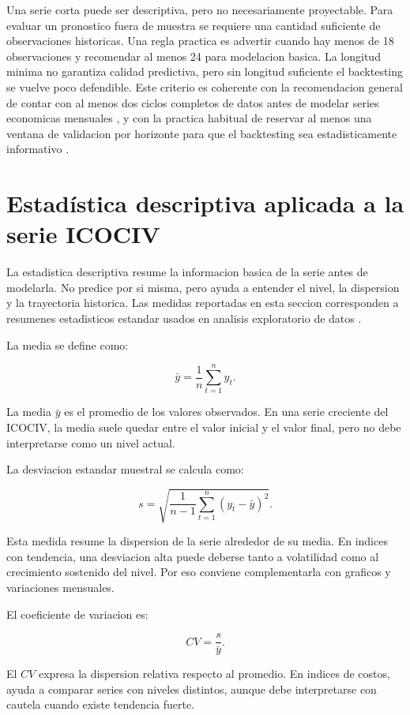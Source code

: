 ﻿\documentclass[12pt,letterpaper]{article}
\newcommand{\ICOCIV}{ICOCIV}
\begin{document}
Una serie corta puede ser descriptiva, pero no necesariamente proyectable. Para evaluar un pronostico fuera de muestra se requiere una cantidad suficiente de observaciones historicas. Una regla practica es advertir cuando hay menos de 18 observaciones y recomendar al menos 24 para modelacion basica. La longitud minima no garantiza calidad predictiva, pero sin longitud suficiente el backtesting se vuelve poco defendible. Este criterio es coherente con la recomendacion general de contar con al menos dos ciclos completos de datos antes de modelar series economicas mensuales \citep{hyndman2021fpp3}, y con la practica habitual de reservar al menos una ventana de validacion por horizonte para que el backtesting sea estadisticamente informativo \citep{tashman2000}.



\section{Estadística descriptiva aplicada a la serie ICOCIV}

La estadistica descriptiva resume la informacion basica de la serie antes de modelarla. No predice por si misma, pero ayuda a entender el nivel, la dispersion y la trayectoria historica. Las medidas reportadas en esta seccion corresponden a resumenes estadisticos estandar usados en analisis exploratorio de datos \citep{nist_eda_summary}.

La media se define como:

\[
\bar{y} = \frac{1}{n}\sum_{t=1}^{n} y_t.
\]

La media \(\bar{y}\) es el promedio de los valores observados. En una serie creciente del \ICOCIV{}, la media suele quedar entre el valor inicial y el valor final, pero no debe interpretarse como un nivel actual.

La desviacion estandar muestral se calcula como:

\[
s = \sqrt{\frac{1}{n-1}\sum_{t=1}^{n}(y_t-\bar{y})^2}.
\]

Esta medida resume la dispersion de la serie alrededor de su media. En indices con tendencia, una desviacion alta puede deberse tanto a volatilidad como al crecimiento sostenido del nivel. Por eso conviene complementarla con graficos y variaciones mensuales.

El coeficiente de variacion es:

\[
CV = \frac{s}{\bar{y}}.
\]

El \(CV\) expresa la dispersion relativa respecto al promedio. En indices de costos, ayuda a comparar series con niveles distintos, aunque debe interpretarse con cautela cuando existe tendencia fuerte.
\end{document}

